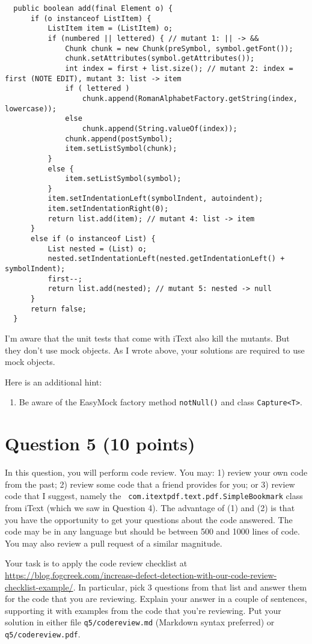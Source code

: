 \documentclass[10pt,hidelinks]{article}
\begin{document}
{\scriptsize
\begin{lstlisting}
  public boolean add(final Element o) {
      if (o instanceof ListItem) {
          ListItem item = (ListItem) o;
          if (numbered || lettered) { // mutant 1: || -> &&
              Chunk chunk = new Chunk(preSymbol, symbol.getFont());
              chunk.setAttributes(symbol.getAttributes());
              int index = first + list.size(); // mutant 2: index = first (NOTE EDIT), mutant 3: list -> item
              if ( lettered )
                  chunk.append(RomanAlphabetFactory.getString(index, lowercase));
              else
                  chunk.append(String.valueOf(index));
              chunk.append(postSymbol);
              item.setListSymbol(chunk);
          }
          else {
              item.setListSymbol(symbol);
          }
          item.setIndentationLeft(symbolIndent, autoindent);
          item.setIndentationRight(0);
          return list.add(item); // mutant 4: list -> item
      }
      else if (o instanceof List) {
          List nested = (List) o;
          nested.setIndentationLeft(nested.getIndentationLeft() + symbolIndent);
          first--;
          return list.add(nested); // mutant 5: nested -> null
      }
      return false;
  }
\end{lstlisting}
}
I'm aware that the unit tests that come with iText also kill the mutants. But they don't use mock objects. As I wrote above, your solutions are required to use mock objects.

\vspace*{1em}\noindent
Here is an additional hint:

\begin{enumerate}
\item Be aware of the EasyMock factory method \verb+notNull()+ and class \verb+Capture<T>+.
\end{enumerate}

\section*{Question 5 (10 points)}
In this question, you will perform code review. You may: 1) review
your own code from the past; 2) review some code that a friend
provides for you; or 3) review code that I suggest, namely the {\tt
  com.itextpdf.text.pdf.SimpleBookmark} class from iText (which we saw
in Question 4). The advantage of (1) and (2) is that you have the
opportunity to get your questions about the code answered. The code
may be in any language but should be between 500 and 1000 lines of
code. You may also review a pull request of a similar magnitude.

Your task is to apply the code review checklist at
\url{https://blog.fogcreek.com/increase-defect-detection-with-our-code-review-checklist-example/}. In
particular, pick 3 questions from that list and answer them for the
code that you are reviewing. Explain your answer in a couple of
sentences, supporting it with examples from the code that you're
reviewing. Put your solution in either file {\tt q5/codereview.md} (Markdown syntax preferred) or {\tt q5/codereview.pdf}. 



\end{document}
